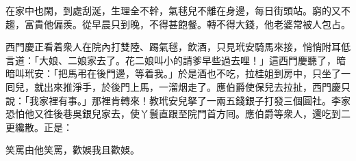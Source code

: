 \begin{myquote}
在家中也閑，到處刮涎，生理全不幹，{}氣毬兒不離在身邊，每日街頭站。窮的又不趨，富貴他偏羨。從早晨只到晚，不得甚飽餐。轉不得大錢，他老婆常被人包占。
\end{myquote}

西門慶正看着衆人在院內打雙陸、踢氣毬，飲酒，只見玳安騎馬來接，悄悄附耳低言道：「大娘、二娘家去了。花二娘叫小的請爹早些過去哩！」這西門慶聽了，暗暗叫玳安：「把馬弔在後門邊，等着我。」於是酒也不吃，拉桂姐到房中，只坐了一囘兒，就出來推淨手，於後門上馬，一溜烟走了。應伯爵使保兒去拉扯，西門慶只說：「我家裡有事。」那裡肯轉來！教玳安兒拏了一兩五錢銀子打發三個圓社。李家恐怕他又徃後巷吳銀兒家去，使丫鬟直跟至院門首方囘。應伯爵等衆人，還吃到二更纔散。正是：

\begin{myquote}
笑罵由他笑罵，歡娛我且歡娛。
\end{myquote}

